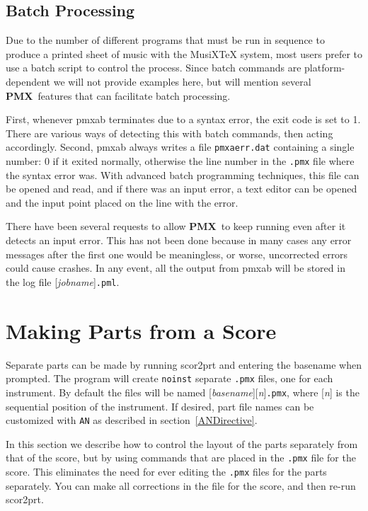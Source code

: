 \documentclass[11pt]{article}
\def\MusiXTeX{MusiX\TeX}
\newcommand\PMXX{\textbf{PMX}}
\newcommand\PMX{\PMXX~}
\def\newfrom{2.59}  %
\def\NEW#1{\ifdim#1 pt<\newfrom pt\else%
\marginpar{\fbox{#1}}\fi}
\begin{document}
\subsection{Batch Processing}

Due \NEW{2.0} to the number of different programs that must be run in sequence 
to produce a printed sheet of music with the \MusiXTeX{} system, most users 
prefer to use a batch script to control the process.  Since batch commands are
platform-dependent we will not provide examples here, but will mention
several \PMX features that can facilitate batch processing. 

First, whenever {\bfx pmxab} terminates due to a syntax
error, the exit code is set to 1.  There are various ways of detecting this
with batch commands, then acting accordingly.  
\NEW{1.4} Second, {\bfx pmxab} always writes a file 
{\tt pmxaerr.dat} containing a single number: 0 if it exited normally, 
otherwise the line number in the {\tt .pmx} file where the syntax
error was.  With advanced batch programming techniques, this file can be 
opened and read, and if there was an input error, a text editor can be 
opened and the input point placed on the line with the error.  

There have been several requests to allow \PMX to keep running even 
after it detects an input error.  
This has not been done because in many cases any error messages after
the first one would be meaningless, or worse, uncorrected errors could 
cause crashes.  In any event, all the output from {\bfx pmxab} will be
stored in the log file [{\it jobname}]{\tt.pml}.

\section{Making Parts from a Score} \label{scor2prt}

	Separate parts can be made by running {\bfx scor2prt} and entering the 
basename when prompted. The program will create {\tt noinst} separate 
{\tt .pmx} files, one for each instrument. By default the files will be named
[{\it basename}][{\it n}]{\tt .pmx}, where [{\it n}] 
is the sequential position of the instrument. If desired, part file names can
be customized with {\tt AN} as described in section~\ref{ANDirective}.

	In this section we describe how to control the layout of the 
parts separately from that of the score, but by using commands 
that are placed in the {\tt .pmx} file for the score.  This eliminates the 
need for ever editing the {\tt .pmx} files for the parts separately.  You 
can make all corrections in the file for the score, and then re-run 
{\bfx scor2prt}.
\end{document}
